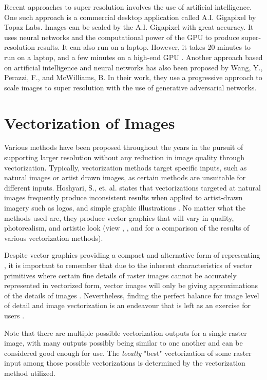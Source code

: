Recent approaches to super resolution involves the use of artificial intelligence. One such approach is a commercial desktop application called A.I. Gigapixel by Topaz Labs. Images can be scaled by the A.I. Gigapixel with great accuracy. It uses neural networks and the computational power of the GPU to produce super-resolution results. It can also run on a laptop. However, it takes 20 minutes to run on a laptop, and a few minutes on a high-end GPU \cite{aigigapixelstory}. Another approach based on artificial intelligence and neural networks has also been proposed by Wang, Y., Perazzi, F., and McWilliams, B. In their work, they use a progressive approach to scale images to super resolution with the use of generative adversarial networks.

\section{Vectorization of Images}
Various methods have been proposed throughout the years in the pursuit of supporting larger resolution without any reduction in image quality through vectorization. Typically, vectorization methods target specific inputs, such as natural images or artist drawn images, as certain methods are unsuitable for different inputs. Hoshyari, S., et. al. states that vectorizations targeted at natural images frequently produce inconsistent results when applied to artist-drawn imagery such as logos, and simple graphic illustrations \cite{hoshyari2018perceptiondriven}. No matter what the methods used are, they produce vector graphics that will vary in quality, photorealism, and artistic look (view \cite{hierarchicaldiffusioncurves}, \cite{barendrecht2018locally}, and \cite{anovelmethodforvectorization} for a comparison of the results of various vectorization methods).

Despite vector graphics providing a compact and alternative form of representing \cite{realtimevectorizationgpu}, it is important to remember that due to the inherent characteristics of vector primitives where certain fine details of raster images cannot be accurately represented in vectorized form, vector images will only be giving approximations of the details of images \cite{optimizedgradientmeshes}. Nevertheless, finding the perfect balance for image level of detail and image vectorization is an endeavour that is left as an exercise for users \cite{anovelmethodforvectorization}.

Note that there are multiple possible vectorization outputs for a single raster image, with many outputs possibly being similar to one another and can be considered good enough for use. The \textit{locally} "best" vectorization of some raster input among those possible vectorizations is determined by the vectorization method utilized.

